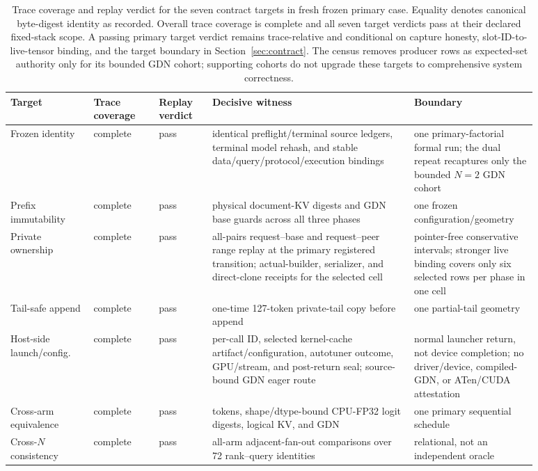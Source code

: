 \documentclass{article}
\begin{document}


\begin{table}[H]
  \caption{Trace coverage and replay verdict for the seven contract targets in
  fresh frozen primary case.  Equality denotes canonical byte-digest identity
  as recorded.  Overall trace coverage is complete and all seven target
  verdicts pass at their declared fixed-stack scope.  A passing primary
  target verdict remains trace-relative and conditional on capture honesty,
  slot-ID-to-live-tensor binding, and the target boundary in Section~\ref{sec:contract}.
  The census removes producer rows as expected-set authority only for its bounded
  GDN cohort; supporting cohorts do not upgrade these targets to comprehensive
  system correctness.}
  \label{tab:witness}
  \centering
  \scriptsize
  \begin{tabular}{@{}>{\raggedright\arraybackslash}p{0.14\linewidth}p{0.11\linewidth}p{0.09\linewidth}>{\raggedright\arraybackslash}p{0.34\linewidth}>{\raggedright\arraybackslash}p{0.20\linewidth}@{}}
    \toprule
    Target & Trace coverage & Replay verdict & Decisive witness & Boundary \\
    \midrule
    Frozen identity & complete & pass & identical preflight/terminal source ledgers, terminal model rehash, and stable data/query/protocol/execution bindings & one primary-factorial formal run; the dual repeat recaptures only the bounded $N=2$ GDN cohort \\
    Prefix immutability & complete & pass & physical document-KV digests and GDN base guards across all three phases & one frozen configuration/geometry \\
    Private ownership & complete & pass & all-pairs request--base and request--peer range replay at the primary registered transition; actual-builder, serializer, and direct-clone receipts for the selected cell & pointer-free conservative intervals; stronger live binding covers only six selected rows per phase in one cell \\
    Tail-safe append & complete & pass & one-time 127-token private-tail copy before append & one partial-tail geometry \\
    Host-side launch/config. & complete & pass & per-call ID, selected kernel-cache artifact/configuration, autotuner outcome, GPU/stream, and post-return seal; source-bound GDN eager route & normal launcher return, not device completion; no driver/device, compiled-GDN, or ATen/CUDA attestation \\
    Cross-arm equivalence & complete & pass & tokens, shape/dtype-bound CPU-FP32 logit digests, logical KV, and GDN & one primary sequential schedule \\
    Cross-$N$ consistency & complete & pass & 288 all-arm adjacent-fan-out comparisons over 72 rank--query identities & relational, not an independent oracle \\
    \bottomrule
  \end{tabular}
\end{table}
\end{document}
